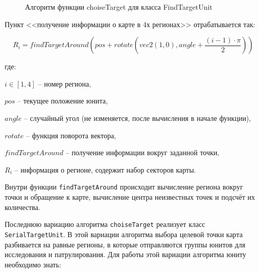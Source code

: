\begin{figure}[h!]

    \centering


    \caption{Алгоритм функции choiseTarget для класса FindTargetUnit}
    \label{fig:unit_algo_find_choise}
\end{figure}

Пункт <<получение информации о карте в 4х регионах>> отрабатывается так:

$$ R_i = findTargetAround( pos + rotate( vec2(1,0), angle + \frac{(i-1)\cdot\pi}{2} ) )$$

где:

$i \in [1,4]$ -- номер региона,

$pos$ -- текущее положение юнита,

$angle$ -- случайный угол (не изменяется, после вычисления в начале функции),

$rotate$ -- функция поворота вектора,

$findTargetAround$ -- получение информации вокруг заданной точки,

$R_i$ -- информация о регионе, содержит набор секторов карты.

Внутри функции \verb|findTargetAround| происходит вычисление региона
вокруг точки и обращение к карте, вычисление центра неизвестных точек и
подсчёт их количества.

\label{ref:algo:choise:serial}

Последнюю вариацию алгоритма \verb|choiseTarget| реализует класс
\verb|SerialTargetUnit|. В этой вариации алгоритма выбора целевой точки
карта разбивается на равные регионы, в которые отправляются группы юнитов
для исследования и патрулирования. Для работы этой вариации алгоритма юниту
необходимо знать:

